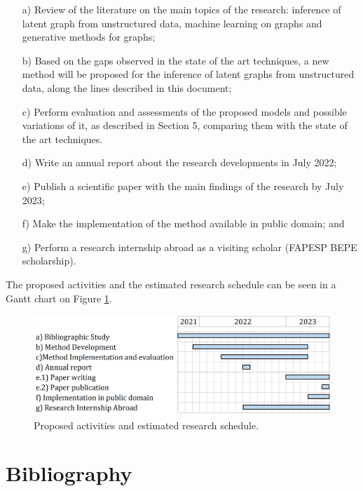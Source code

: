 \documentclass[12pt,a4paper]{article}
\begin{document}
	\begin{itemize}
	\item[a)]  Review of the literature on the main topics of the research: inference of latent graph from unstructured data, machine learning on graphs and generative methods for graphs; 
	\item[b)] Based on the gaps observed in the state of the art techniques, a new method will be proposed for the inference of latent graphs from unstructured data, along the lines described in this document; 
	\item[c)] Perform evaluation and assessments of the proposed models and possible variations of it, as described in Section 5, comparing them with the state of the art techniques.
	\item[d)] Write an annual report about the research developments in July 2022;
	\item[e)] Publish a scientific paper with the main findings of the research by July 2023;
	\item[f)] Make the implementation of the method available in public domain; and
	\item[g)] Perform a research internship abroad as a visiting scholar (FAPESP BEPE scholarship).
	\end{itemize}
	
	The proposed activities and the estimated research schedule can be seen in a Gantt chart on Figure \ref{plan}.
	
	\begin{figure}[hbtp]
		\centering \includegraphics[scale=0.40]{plan_v2.png}
		\caption{Proposed activities and estimated research schedule. \label{plan}}
	\end{figure}
	
	\section{Bibliography}
	\printbibliography
	
\end{document}
